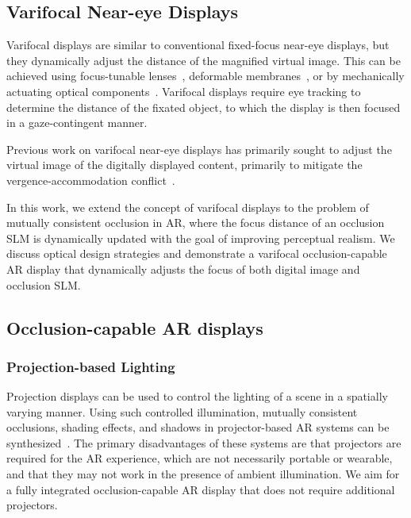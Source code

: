 

\subsection{Varifocal Near-eye Displays}
\label{sec:varifocal_occlusion:related:varifocal}
Varifocal displays are similar to conventional fixed-focus near-eye displays, but they dynamically adjust the distance of the magnified virtual image. This can be achieved using focus-tunable lenses~\cite{Liu2008Optical,Konrad2016Novel,Johnson:16,Padmanaban2016Optimizing,Laffont:2018,Rathinavel2018}, deformable membranes~\cite{Dunn2017Wide,chakravarthula2018focusar}, or by mechanically actuating optical components~\cite{Shiwa1996proposal,Padmanaban2016Optimizing,Aksit2017Near}. Varifocal displays require eye tracking to determine the distance of the fixated object, to which the display is then focused in a gaze-contingent manner. 


Previous work on varifocal near-eye displays has primarily sought to adjust the virtual image of the digitally displayed content, primarily to mitigate the vergence-accommodation conflict~\cite{kooi2004visual,lambooij2009visual}. %

In this work, we extend the concept of varifocal displays to the problem of mutually consistent occlusion in AR, where the focus distance of an occlusion SLM is dynamically updated with the goal of improving perceptual realism. 
We discuss optical design strategies and demonstrate a varifocal occlusion-capable AR display that dynamically adjusts the focus of both digital image and occlusion SLM.

\subsection{Occlusion-capable AR displays}

\subsubsection{Projection-based Lighting}

Projection displays can be used to control the lighting of a scene in a spatially varying manner. Using such controlled illumination, mutually consistent occlusions, shading effects, and shadows in projector-based AR systems can be synthesized~\cite{Bimber:2002,bimber2003consistent,maimone2013general,avveduto2017real}.
The primary disadvantages of these systems are that projectors are required for the AR experience, which are not necessarily portable or wearable, and that they may not work in the presence of ambient illumination.
We aim for a fully integrated occlusion-capable AR display that does not require additional projectors.


